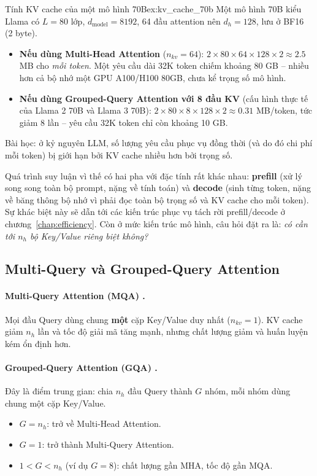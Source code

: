 \begin{example}{Tính KV cache của một mô hình 70B}{ex:kv_cache_70b}
Một mô hình 70B kiểu Llama có $L = 80$ lớp, $d_{\text{model}} = 8192$, 64 đầu attention nên $d_h = 128$, lưu ở BF16 (2 byte).
\begin{itemize}
	\item \textbf{Nếu dùng Multi-Head Attention} ($n_{kv} = 64$): $2 \times 80 \times 64 \times 128 \times 2 \approx 2.5$ MB cho \emph{mỗi token}. Một yêu cầu dài 32K token chiếm khoảng 80 GB -- nhiều hơn cả bộ nhớ một GPU A100/H100 80GB, chưa kể trọng số mô hình.
	\item \textbf{Nếu dùng Grouped-Query Attention với 8 đầu KV} (cấu hình thực tế của Llama 2 70B và Llama 3 70B): $2 \times 80 \times 8 \times 128 \times 2 \approx 0.31$ MB/token, tức giảm 8 lần -- yêu cầu 32K token chỉ còn khoảng 10 GB.
\end{itemize}
Bài học: ở kỷ nguyên LLM, số lượng yêu cầu phục vụ đồng thời (và do đó chi phí mỗi token) bị giới hạn bởi KV cache nhiều hơn bởi trọng số.
\end{example}

Quá trình suy luận vì thế có hai pha với đặc tính rất khác nhau: \textbf{prefill} (xử lý song song toàn bộ prompt, nặng về tính toán) và \textbf{decode} (sinh từng token, nặng về băng thông bộ nhớ vì phải đọc toàn bộ trọng số và KV cache cho mỗi token). Sự khác biệt này sẽ dẫn tới các kiến trúc phục vụ tách rời prefill/decode ở chương~\ref{chap:efficiency}. Còn ở mức kiến trúc mô hình, câu hỏi đặt ra là: \emph{có cần tới $n_h$ bộ Key/Value riêng biệt không?}

\subsection{Multi-Query và Grouped-Query Attention}
\label{ssec:mqa_gqa}

\paragraph{Multi-Query Attention (MQA) \cite{shazeer2019fast}.} Mọi đầu Query dùng chung \textbf{một} cặp Key/Value duy nhất ($n_{kv} = 1$). KV cache giảm $n_h$ lần và tốc độ giải mã tăng mạnh, nhưng chất lượng giảm và huấn luyện kém ổn định hơn.

\paragraph{Grouped-Query Attention (GQA) \cite{ainslie2023gqa}.} Đây là điểm trung gian: chia $n_h$ đầu Query thành $G$ nhóm, mỗi nhóm dùng chung một cặp Key/Value.
\begin{itemize}
	\item $G = n_h$: trở về Multi-Head Attention.
	\item $G = 1$: trở thành Multi-Query Attention.
	\item $1 < G < n_h$ (ví dụ $G = 8$): chất lượng gần MHA, tốc độ gần MQA.
\end{itemize}

